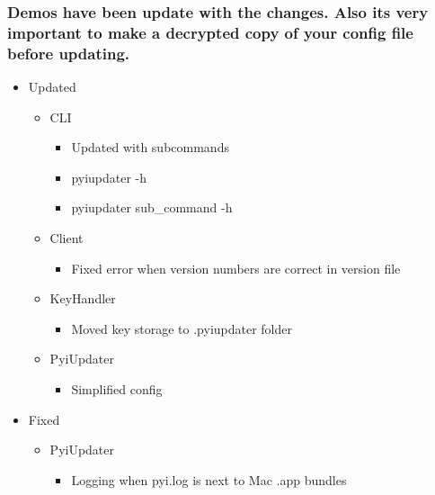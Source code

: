 \documentclass[letterpaper,10pt,english]{sphinxmanual}
\begin{document}
\subsubsection{Demos have been update with the changes. Also its very important to make a decrypted copy of your config file before updating.}
\label{release_history:demos-have-been-update-with-the-changes-also-its-very-important-to-make-a-decrypted-copy-of-your-config-file-before-updating}\begin{itemize}
\item {} 
Updated
\begin{itemize}
\item {} 
CLI
\begin{itemize}
\item {} 
Updated with subcommands

\item {} 
pyiupdater -h

\item {} 
pyiupdater sub\_command -h

\end{itemize}

\item {} 
Client
\begin{itemize}
\item {} 
Fixed error when version numbers are correct in version file

\end{itemize}

\item {} 
KeyHandler
\begin{itemize}
\item {} 
Moved key storage to .pyiupdater folder

\end{itemize}

\item {} 
PyiUpdater
\begin{itemize}
\item {} 
Simplified config

\end{itemize}

\end{itemize}

\item {} 
Fixed
\begin{itemize}
\item {} 
PyiUpdater
\begin{itemize}
\item {} 
Logging when pyi.log is next to Mac .app bundles


\end{itemize}
\end{itemize}
\end{itemize}
\end{document}

